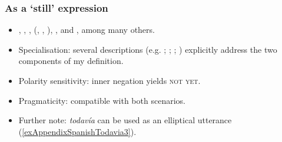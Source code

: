 \subsubsection{As a \lq{}still\rq{ }expression}
\label{appendixSpanishTodaviaStill}
\begin{itemize}
	\item \Textcite{vanderAuwera1998}, \textcite{Bosque2016}, \textcite{EderlyCurco2016},	
		\citeauthor{Garrido1991} (\citeyear{Garrido1991}, \citeyear{Garrido1992}, \citeyear{Garrido1993}), \textcite{Morera1999}, \textcite[§§24.4.m, 30.8f–m]{RAEGramatica} and \textcite{Trujillo1990}, among many others.
	\item Specialisation: several descriptions (e.g. \cite{Bosque2016}; \cite{EderlyCurco2016}; \cite{Garrido1991}; \cite{RAEGramatica}) explicitly address the two components of my definition.
	\item Polarity sensitivity: inner negation yields \textsc{not yet}.
	\item Pragmaticity: compatible with both scenarios.
	\item Further note: \textit{todavía} can be used as an elliptical utterance (\ref{exAppendixSpanishTodavia3}).
\end{itemize}
